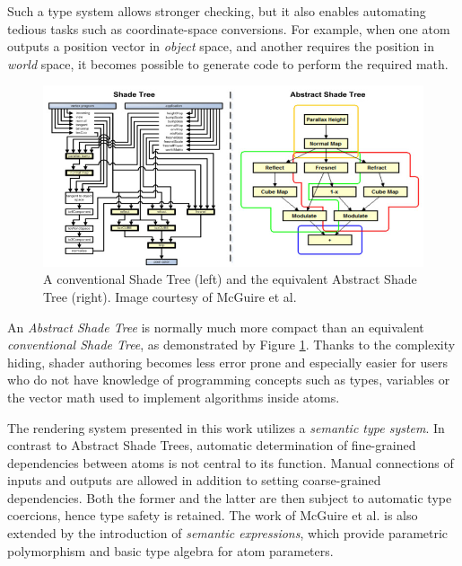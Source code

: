 Such a type system allows stronger checking, but it also enables automating tedious tasks such as coordinate-space conversions. For example, when one atom outputs a position vector in \emph{object} space, and another requires the position in \emph{world} space, it becomes possible to generate code to perform the required math.

\begin{figure}[h!]
  \centering
    \includegraphics[width=0.9\linewidth]{./Chapters/AbstractShadeTree.jpg}
    \caption[Abstract Shade Tree]{A conventional Shade Tree (left) and the equivalent Abstract Shade Tree (right). Image courtesy of McGuire et al.}
  \label{fig:AbstractShadeTree}
\end{figure}

An \emph{Abstract Shade Tree} is normally much more compact than an equivalent \emph{conventional Shade Tree}, as demonstrated by Figure \ref{fig:AbstractShadeTree}. Thanks to the complexity hiding, shader authoring becomes less error prone and especially easier for users who do not have knowledge of programming concepts such as types, variables or the vector math used to implement algorithms inside atoms.
 
The rendering system presented in this work utilizes a \emph{semantic type system}. In contrast to Abstract Shade Trees, automatic determination of fine-grained dependencies between atoms is not central to its function. Manual connections of inputs and outputs are allowed in addition to setting coarse-grained dependencies. Both the former and the latter are then subject to automatic type coercions, hence type safety is retained. The work of McGuire et al. is also extended by the introduction of \emph{semantic expressions}, which provide parametric polymorphism and basic type algebra for atom parameters.

